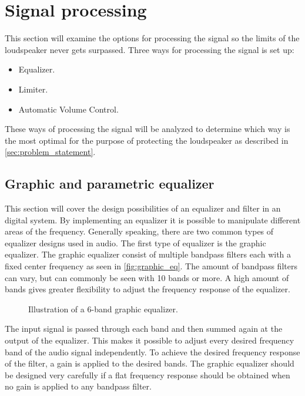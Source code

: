 \section{Signal processing}
This section will examine the options for processing the signal so the limits of the loudspeaker never gets surpassed. Three ways for processing the signal is set up:  
\begin{itemize}
\item Equalizer.
\item Limiter.    
\item Automatic Volume Control. 
\end{itemize}
These ways of processing the signal will be analyzed to determine which way is the most optimal for the purpose of protecting the loudspeaker as described in \autoref{sec:problem_statement}.  

\subsection{Graphic and parametric equalizer}\label{sec:tech_equalizer}
This section will cover the design possibilities of an equalizer and filter in an digital system. 
By implementing an equalizer it is possible to manipulate different areas of the frequency. Generally speaking, there are two common types of equalizer designs used in audio. The first type of equalizer is the graphic equalizer. The graphic equalizer consist of multiple bandpass filters each with a fixed center frequency as seen in \autoref{fig:graphic_eq}. The amount of bandpass filters can vary, but can commonly be seen with 10 bands or more. A high amount of bands gives greater flexibility to adjust the frequency response of the equalizer.

\begin{figure}[H]
\centering
{}

\caption{Illustration of a 6-band graphic equalizer.}
\label{fig:graphic_eq}
\end{figure}

The input signal is passed through each band and then summed again at the output of the equalizer. This makes it possible to adjust every desired frequency band of the audio signal independently. To achieve the desired frequency response of the filter, a gain is applied to the desired bands. The graphic equalizer should be designed very carefully if a flat frequency response should be obtained when no gain is applied to any bandpass filter.


